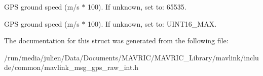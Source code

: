 G\+P\+S ground speed (m/s $\ast$ 100). If unknown, set to\+: 65535. 

G\+P\+S ground speed (m/s $\ast$ 100). If unknown, set to\+: U\+I\+N\+T16\+\_\+\+M\+A\+X. 

The documentation for this struct was generated from the following file\+:\begin{DoxyCompactItemize}
\item 
/run/media/julien/\+Data/\+Documents/\+M\+A\+V\+R\+I\+C/\+M\+A\+V\+R\+I\+C\+\_\+\+Library/mavlink/include/common/mavlink\+\_\+msg\+\_\+gps\+\_\+raw\+\_\+int.\+h\end{DoxyCompactItemize}

